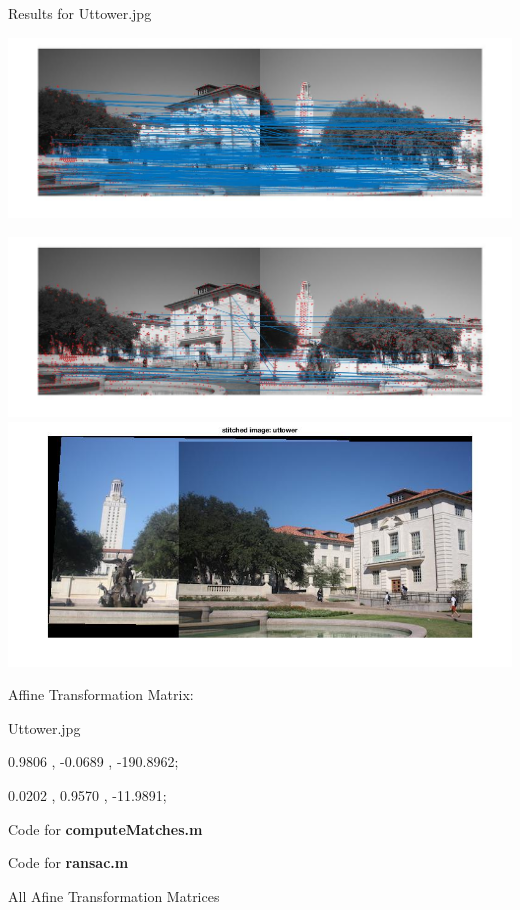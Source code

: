 \documentclass[fleqn]{article}
\begin{document}
\newpage


Results for Uttower.jpg
\begin{center}
\includegraphics[width=1.2\textwidth]{uttower1.jpg}

\includegraphics[width=1.2\textwidth]{uttower2.jpg}
\newline
\includegraphics[width=1.2\textwidth]{uttower3.jpg}

Affine Transformation Matrix:
\vspace{10 mm}

Uttower.jpg

0.9806   ,   -0.0689    ,   -190.8962;

0.0202   ,   0.9570    ,    -11.9891;

\end{center}

\newpage

Code for \textbf{computeMatches.m}




\newpage

Code for \textbf{ransac.m}




\newpage
All Afine Transformation Matrices

\newpage
\end{document}
